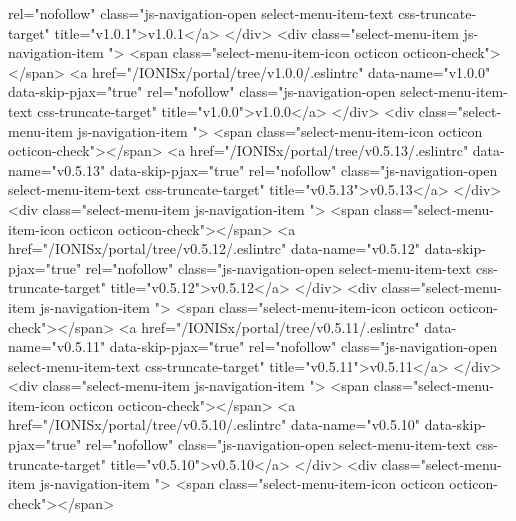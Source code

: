                  rel="nofollow"
                 class="js-navigation-open select-menu-item-text css-truncate-target"
                 title="v1.0.1">v1.0.1</a>
            </div>
            <div class="select-menu-item js-navigation-item ">
              <span class="select-menu-item-icon octicon octicon-check"></span>
              <a href="/IONISx/portal/tree/v1.0.0/.eslintrc"
                 data-name="v1.0.0"
                 data-skip-pjax="true"
                 rel="nofollow"
                 class="js-navigation-open select-menu-item-text css-truncate-target"
                 title="v1.0.0">v1.0.0</a>
            </div>
            <div class="select-menu-item js-navigation-item ">
              <span class="select-menu-item-icon octicon octicon-check"></span>
              <a href="/IONISx/portal/tree/v0.5.13/.eslintrc"
                 data-name="v0.5.13"
                 data-skip-pjax="true"
                 rel="nofollow"
                 class="js-navigation-open select-menu-item-text css-truncate-target"
                 title="v0.5.13">v0.5.13</a>
            </div>
            <div class="select-menu-item js-navigation-item ">
              <span class="select-menu-item-icon octicon octicon-check"></span>
              <a href="/IONISx/portal/tree/v0.5.12/.eslintrc"
                 data-name="v0.5.12"
                 data-skip-pjax="true"
                 rel="nofollow"
                 class="js-navigation-open select-menu-item-text css-truncate-target"
                 title="v0.5.12">v0.5.12</a>
            </div>
            <div class="select-menu-item js-navigation-item ">
              <span class="select-menu-item-icon octicon octicon-check"></span>
              <a href="/IONISx/portal/tree/v0.5.11/.eslintrc"
                 data-name="v0.5.11"
                 data-skip-pjax="true"
                 rel="nofollow"
                 class="js-navigation-open select-menu-item-text css-truncate-target"
                 title="v0.5.11">v0.5.11</a>
            </div>
            <div class="select-menu-item js-navigation-item ">
              <span class="select-menu-item-icon octicon octicon-check"></span>
              <a href="/IONISx/portal/tree/v0.5.10/.eslintrc"
                 data-name="v0.5.10"
                 data-skip-pjax="true"
                 rel="nofollow"
                 class="js-navigation-open select-menu-item-text css-truncate-target"
                 title="v0.5.10">v0.5.10</a>
            </div>
            <div class="select-menu-item js-navigation-item ">
              <span class="select-menu-item-icon octicon octicon-check"></span>
